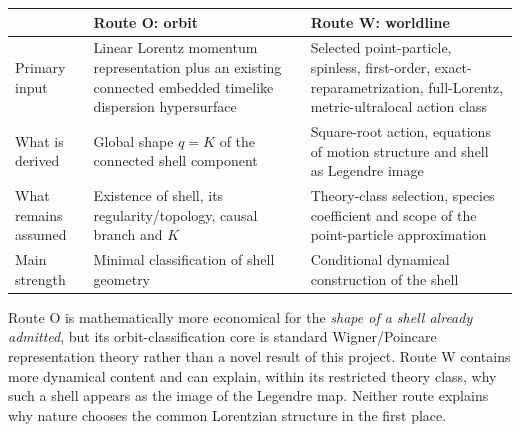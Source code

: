 \documentclass[11pt,a4paper]{article}
\begin{document}
\begin{center}
\begin{tabular}{>{\raggedright\arraybackslash}p{}>{\raggedright\arraybackslash}p{}>{\raggedright\arraybackslash}p{}}
\toprule
 & \textbf{Route O: orbit} & \textbf{Route W: worldline}\\
\midrule
Primary input & Linear Lorentz momentum representation plus an existing connected embedded timelike dispersion hypersurface & Selected point-particle, spinless, first-order, exact-reparametrization, full-Lorentz, metric-ultralocal action class\\
What is derived & Global shape $q=K$ of the connected shell component & Square-root action, equations of motion structure and shell as Legendre image\\
What remains assumed & Existence of shell, its regularity/topology, causal branch and $K$ & Theory-class selection, species coefficient and scope of the point-particle approximation\\
Main strength & Minimal classification of shell geometry & Conditional dynamical construction of the shell\\
\bottomrule
\end{tabular}
\end{center}

Route O is mathematically more economical for the \emph{shape of a shell already admitted}, but its orbit-classification core is standard Wigner/Poincare representation theory rather than a novel result of this project.  Route W contains more dynamical content and can explain, within its restricted theory class, why such a shell appears as the image of the Legendre map.  Neither route explains why nature chooses the common Lorentzian structure in the first place.
\end{document}
